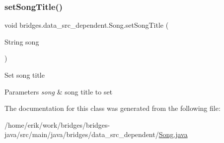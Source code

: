 \subsubsection{\texorpdfstring{set\+Song\+Title()}{setSongTitle()}}
{\footnotesize\ttfamily void bridges.\+data\+\_\+src\+\_\+dependent.\+Song.\+set\+Song\+Title (\begin{DoxyParamCaption}\item[{String}]{song }\end{DoxyParamCaption})}

Set song title 
\begin{DoxyParams}{Parameters}
{\em song} & song title to set \\
\hline
\end{DoxyParams}


The documentation for this class was generated from the following file\+:\begin{DoxyCompactItemize}
\item 
/home/erik/work/bridges/bridges-\/java/src/main/java/bridges/data\+\_\+src\+\_\+dependent/\hyperlink{_song_8java}{Song.\+java}\end{DoxyCompactItemize}
